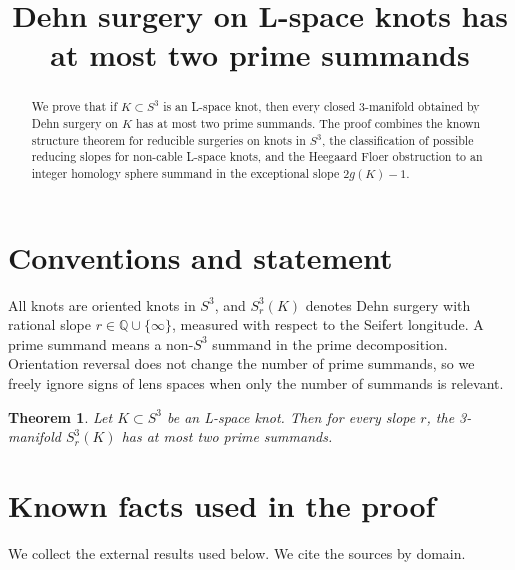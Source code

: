 \documentclass{article}
\title{Dehn surgery on L-space knots has at most two prime summands}
\author{}
\date{}
\newtheorem{theorem}{Theorem}
\theoremstyle{definition}
\begin{document}
\maketitle

\begin{abstract}
We prove that if \(K\subset S^{3}\) is an L-space knot, then every closed
3-manifold obtained by Dehn surgery on \(K\) has at most two prime summands.
The proof combines the known structure theorem for reducible surgeries on
knots in \(S^{3}\), the classification of possible reducing slopes for
non-cable L-space knots, and the Heegaard Floer obstruction to an integer
homology sphere summand in the exceptional slope \(2g(K)-1\).
\end{abstract}

\section{Conventions and statement}

All knots are oriented knots in \(S^{3}\), and \(S^{3}_{r}(K)\) denotes
Dehn surgery with rational slope \(r\in \mathbb{Q}\cup\{\infty\}\), measured
with respect to the Seifert longitude.  A prime summand means a non-\(S^{3}\)
summand in the prime decomposition.  Orientation reversal does not change the
number of prime summands, so we freely ignore signs of lens spaces when only
the number of summands is relevant.

\begin{theorem}\label{thm:main}
Let \(K\subset S^{3}\) be an L-space knot.  Then for every slope \(r\),
the 3-manifold \(S^{3}_{r}(K)\) has at most two prime summands.
\end{theorem}

\section{Known facts used in the proof}

We collect the external results used below.  We cite the sources by domain.
\end{document}
